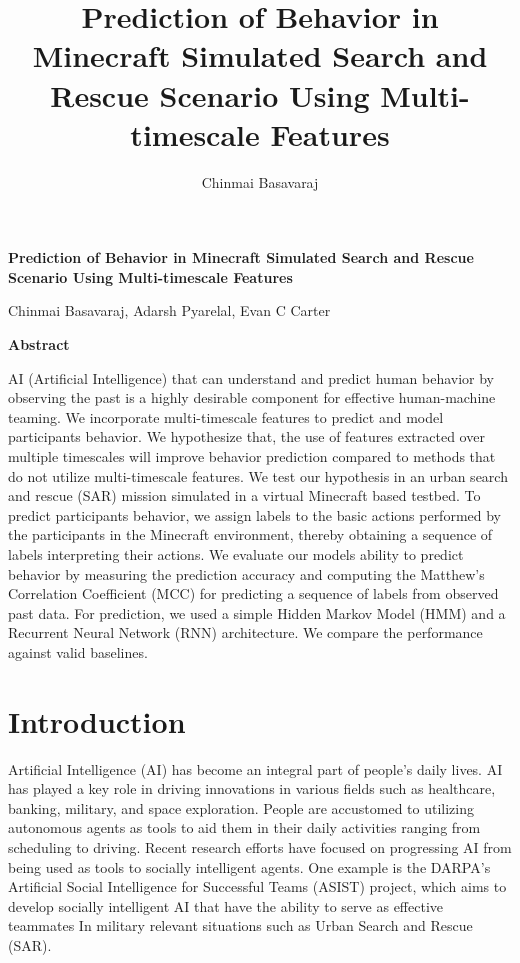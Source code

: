 \documentclass{article}
\title{Prediction of Behavior in Minecraft Simulated Search and Rescue Scenario Using Multi-timescale Features}
\author{Chinmai Basavaraj}
\begin{document}
\onehalfspacing

\begin{titlepage}
\begin{center}
    \Large{
    \textbf{Prediction of Behavior in Minecraft Simulated Search and 
    Rescue Scenario Using Multi-timescale Features}}
    \vspace{0.5cm}
    
    Chinmai Basavaraj, Adarsh Pyarelal, Evan C Carter 
    
    \Large{
    \vspace{0.9cm}
    \textbf{Abstract}}

\end{center}

AI (Artificial Intelligence) that can understand and predict human behavior by observing the past is a highly desirable component for effective human-machine teaming. 
We incorporate multi-timescale features to  predict and model participants behavior. 
We hypothesize that, the use of features extracted over multiple timescales will  improve behavior prediction compared to methods that do not utilize multi-timescale features. 
We test our hypothesis in an urban search and rescue (SAR) mission simulated in a virtual Minecraft based testbed. 
To predict participants behavior, we assign labels to the basic actions performed
by the participants in the Minecraft environment, thereby obtaining a sequence of labels interpreting their actions. 
We evaluate our models ability to predict behavior by measuring the prediction accuracy and computing the Matthew's Correlation Coefficient (MCC) for predicting a sequence of labels from observed past data. 
For prediction, we used a simple Hidden Markov Model (HMM) and a Recurrent Neural Network (RNN) architecture. We compare the performance against valid baselines.

\end{titlepage}


\section*{Introduction}

Artificial Intelligence (AI) has become an integral part of people's daily lives. 
AI has played a key role in driving innovations in various fields such as 
healthcare, banking, military, and space exploration. People are accustomed 
to utilizing autonomous agents as tools to aid them in their  daily activities 
ranging from scheduling to driving. Recent research efforts have focused on
progressing AI from being used as tools to socially intelligent agents. 
One example is the DARPA’s Artificial Social Intelligence for Successful 
Teams (ASIST) project, which aims to develop socially intelligent AI 
that have the ability to serve as effective teammates In military 
relevant situations such as Urban Search and Rescue (SAR).
\end{document}
